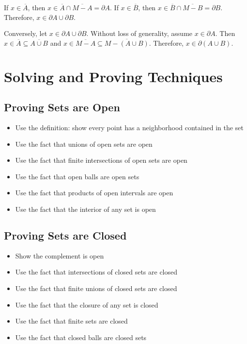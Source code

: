 If $x \in \overline{A}$, then $x \in \overline{A} \cap \overline{M - A} = \partial A$. If $x \in \overline{B}$, then $x \in \overline{B} \cap \overline{M - B} = \partial B$. Therefore, $x \in \partial A \cup \partial B$.

Conversely, let $x \in \partial A \cup \partial B$. Without loss of generality, assume $x \in \partial A$. Then $x \in \overline{A} \subseteq \overline{A \cup B}$ and $x \in \overline{M - A} \subseteq \overline{M - (A \cup B)}$. Therefore, $x \in \partial(A \cup B)$.


\section{Solving and Proving Techniques}

\subsection*{Proving Sets are Open}
\begin{itemize}
\item Use the definition: show every point has a neighborhood contained in the set
\item Use the fact that unions of open sets are open
\item Use the fact that finite intersections of open sets are open
\item Use the fact that open balls are open sets
\item Use the fact that products of open intervals are open
\item Use the fact that the interior of any set is open
\end{itemize}

\subsection*{Proving Sets are Closed}
\begin{itemize}
\item Show the complement is open
\item Use the fact that intersections of closed sets are closed
\item Use the fact that finite unions of closed sets are closed
\item Use the fact that the closure of any set is closed
\item Use the fact that finite sets are closed
\item Use the fact that closed balls are closed sets
\end{itemize}

